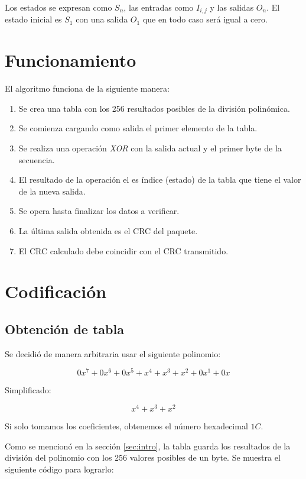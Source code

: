 \documentclass[
12pt,
spanish,
singlespacing,
parskip,
headsepline]{article}
\begin{document}
Los estados se expresan como $S_n$, las entradas como $I_{i,j}$ y las salidas $O_{n}$.
El estado inicial es $S_1$ con una salida $O_1$ que en todo caso será igual a cero.

\section{Funcionamiento}
\label{sec:func}

El algoritmo funciona de la siguiente manera:

\begin{enumerate}
	\item Se crea una tabla con los 256 resultados posibles de la división polinómica.
	\item Se comienza cargando como salida el primer elemento de la tabla.
	\item Se realiza una operación \emph{XOR} con la salida actual y el primer byte de la secuencia.
	\item El resultado de la operación el es índice (estado) de la tabla que tiene el valor de la nueva salida.
	\item Se opera hasta finalizar los datos a verificar.
	\item La última salida obtenida es el CRC del paquete.
	\item El CRC calculado debe coincidir con el CRC transmitido.
\end{enumerate}

\section{Codificación}
\label{sec:cod}

\subsection{Obtención de tabla}
\label{sub:tabla}

Se decidió de manera arbitraria usar el siguiente polinomio: 

$$0x^{7} + 0x^{6} + 0x^{5} + x^{4} + x^{3} + x^{2} + 0x^{1} + 0x $$

Simplificado: 

$$x^{4} + x^{3} + x^{2}$$

Si solo tomamos los coeficientes, obtenemos el número hexadecimal $1C$.

Como se mencionó en la sección \ref{sec:intro}, la tabla guarda los resultados de la división del polinomio con los 256 valores posibles de un byte.
Se muestra el siguiente código para lograrlo: 
\end{document}
